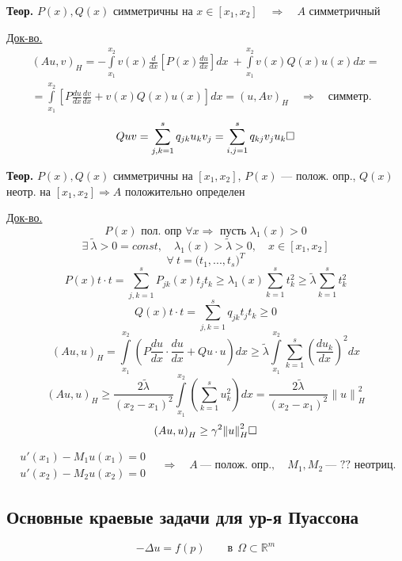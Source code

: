 \documentclass[12pt, a4paper]{article}
\newcommand{\Int}{\int\limits}
\newcommand{\Sum}{\sum\limits}
\begin{document}
\textbf{Теор.} $P(x), Q(x)$ симметричны на $ x \in [x_1, x_2] \quad \Rightarrow \quad A $ симметричный

\underline{Док-во.}
\begin{multline*}
	{(Au, v)}_H = - \Int_{x_1}^{x_2} v(x) \frac{d}{dx} \left[P(x) \frac{du}{dx}\right] dx \ + \Int_{x_1}^{x_2} v(x)  Q(x) u(x) dx = \\
	= \Int_{x_1}^{x_2} \left[P \frac{du }{dx } \frac{dv}{dx} + v(x) Q(x) u(x) \right] dx = {(u, Av)}_H \quad \Rightarrow \quad \text{симметр.}
\end{multline*}
\[ Q u v = \Sum_{j,k=1}^{s } q_{jk} u_k v_j = \Sum_{i,j =1}^{s} q_{kj} v_j u_k \hfill \square \]

\textbf{Теор.} $P(x), Q(x)$ симметричны на $[x_1, x_2]$, $P(x)$ --- полож. опр.,  $Q(x)$ неотр. на $[x_1, x_2] \Rightarrow A $ положительно определен

\underline{Док-во.}
\[ P(x) \textrm{ пол. опр } \forall x \Rightarrow \textrm{ пусть } \lambda_1(x) >0  \]
\[ \exists \ \tilde{\lambda} > 0 = const, \quad \lambda_1(x) > \tilde{\lambda} > 0, \quad  x \in [x_1, x_2] \]
\[ \forall \ t = {\bigl(t_1, ..., t_s\bigr)}^T \]
\[ P(x) t \cdot t = \Sum_{j, k=1}^{s } P_{jk}(x)t_j t_k \geq  \lambda_1(x) \Sum_{k=1}^{s } t_k^2 \geq \tilde{\lambda } \Sum_{k=1}^{s } t^2_k \]
\[ Q(x) t\cdot t = \Sum_{j, k=1}^{s }q_{jk} t_j t_k \geq 0 \]
\[ {(Au, u)}_H = \Int_{x_1}^{x_2} \left(P \frac{du }{dx } \cdot \frac{du }{dx} + Qu \cdot u \right) dx \geq \tilde{\lambda } \Int_{x_1}^{x_2} \Sum_{k=1}^s {\left(\frac{du_k}{dx}\right)}^2 dx \]
\[ (Au, u)_H \geq \frac{2 \tilde{\lambda}}{{(x_2 - x_1)}^2} \Int_{x_1}^{x_2} \left(\Sum_{k=1}^{s } u_k^2\right) dx = \frac{2 \tilde{\lambda}}{{(x_2 - x_1)}^2} {\|u\|}^2_H \]
\[ {(Au, u)}_H \geq \gamma^2 {\|u\|}^2_H \hfill \square \]


\[ \left. \begin{array}{l}
	u'(x_1) - M_1 u(x_1) = 0 \\
	u'(x_2) - M_2 u(x_2) = 0
\end{array} \right. \quad \Rightarrow \quad A \ \text{--- полож. опр.}, \quad M_1, M_2 \ \text{--- ?? неотриц.} \]

\subsection{Основные краевые задачи для ур-я Пуассона}

\[ -\Delta u = f(p) \qquad \text{в} \ \ \Omega \subset \mathbb{R}^m \label{6.1} \tag{6.1} \]
\end{document}
